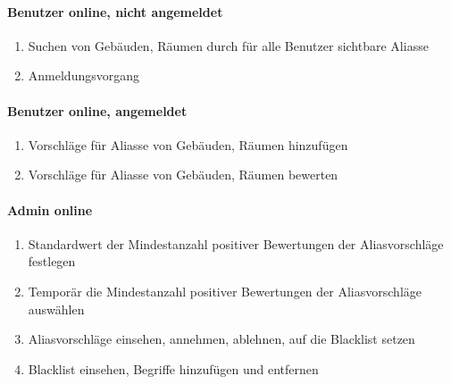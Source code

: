 \paragraph{Benutzer online, nicht angemeldet}
\begin{enumerate}[label=\textbf{/T\arabic*0/}, align=left]
	\item Suchen von Gebäuden, Räumen durch für alle Benutzer sichtbare Aliasse
	\item Anmeldungsvorgang
\end{enumerate}

\paragraph{Benutzer online, angemeldet}
\begin{enumerate}[label=\textbf{/T\arabic*0/}, align=left]
	\item Vorschläge für Aliasse von Gebäuden, Räumen hinzufügen
	\item Vorschläge für Aliasse von Gebäuden, Räumen bewerten
\end{enumerate}

\paragraph{Admin online}
\begin{enumerate}[label=\textbf{/T\arabic*0/}, align=left]
	\item Standardwert der Mindestanzahl positiver Bewertungen der Aliasvorschläge festlegen
	\item Temporär die Mindestanzahl positiver Bewertungen der Aliasvorschläge auswählen
	\item Aliasvorschläge einsehen, annehmen, ablehnen, auf die Blacklist setzen
	\item Blacklist einsehen, Begriffe hinzufügen und entfernen
\end{enumerate}